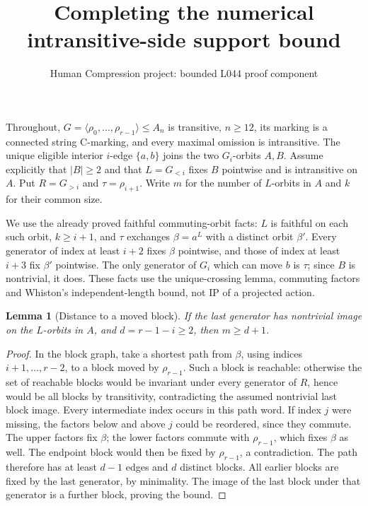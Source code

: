 \documentclass[11pt,a4paper]{article}
\title{Completing the numerical intransitive-side support bound}
\author{Human Compression project: bounded L044 proof component}
\date{}
\newtheorem{lemma}{Lemma}
\newcommand{\gen}[1]{\langle#1\rangle}
\begin{document}
\maketitle
Throughout, $G=\gen{\rho_0,\ldots,\rho_{r-1}}\leq A_n$ is
transitive, $n\geq12$, its marking is a connected string C-marking,
and every maximal omission is intransitive. The unique eligible
interior $i$-edge $\{a,b\}$ joins the two $G_i$-orbits $A,B$.
Assume explicitly that $|B|\geq2$ and that $L=G_{<i}$ fixes $B$
pointwise and is intransitive on $A$. Put $R=G_{>i}$ and
$\tau=\rho_{i+1}$. Write $m$ for the number of $L$-orbits in $A$
and $k$ for their common size.

We use the already proved faithful commuting-orbit facts: $L$ is
faithful on each such orbit, $k\geq i+1$, and $\tau$ exchanges
$\beta=a^L$ with a distinct orbit $\beta'$. Every generator of
index at least $i+2$ fixes $\beta$ pointwise, and those of index
at least $i+3$ fix $\beta'$ pointwise. The only generator of $G_i$
which can move $b$ is $\tau$; since $B$ is nontrivial, it does.
These facts use the unique-crossing lemma, commuting factors and
Whiston's independent-length bound, not IP of a projected action.

\begin{lemma}[Distance to a moved block]\label{blocks}
If the last generator has nontrivial image on the $L$-orbits in
$A$, and $d=r-1-i\geq2$, then $m\geq d+1$.
\end{lemma}
\begin{proof}
In the block graph, take a shortest path from $\beta$, using
indices $i+1,\ldots,r-2$, to a block moved by $\rho_{r-1}$.
Such a block is reachable: otherwise the set of reachable blocks
would be invariant under every generator of $R$, hence would be
all blocks by transitivity, contradicting the assumed nontrivial
last block image.
Every intermediate index occurs in this path word. If index $j$
were missing, the factors below and above $j$ could be reordered,
since they commute. The upper factors fix $\beta$; the lower
factors commute with $\rho_{r-1}$, which fixes $\beta$ as well.
The endpoint block would then be fixed by $\rho_{r-1}$, a
contradiction. The path therefore has at least $d-1$ edges and
$d$ distinct blocks. All earlier blocks are fixed by the last
generator, by minimality. The image of the last block under that
generator is a further block, proving the bound.
\end{proof}
\end{document}
